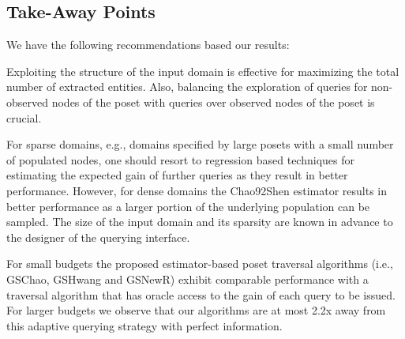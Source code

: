 \subsection{Take-Away Points}
We have the following recommendations based our results:
\squishlist
\item Exploiting the structure of the input domain is effective for maximizing the total number of extracted entities. Also, balancing the exploration of queries for non-observed nodes of the poset with queries over observed nodes of the poset is crucial.
\item For sparse domains, e.g., domains specified by large posets with a small number of populated nodes, one should resort to regression based techniques for estimating the expected gain of further queries as they result in better performance. However, for dense domains the Chao92Shen estimator results in better performance as a larger portion of the underlying population can be sampled. The size of the input domain and its sparsity are known in advance to the designer of the querying interface. 
\item For small budgets the proposed estimator-based poset traversal algorithms (i.e., GSChao, GSHwang and GSNewR) exhibit comparable performance with a traversal algorithm that has oracle access to the gain of each query to be issued. For larger budgets we observe that our algorithms are at most 2.2x away from this adaptive querying strategy with perfect information.
\squishend